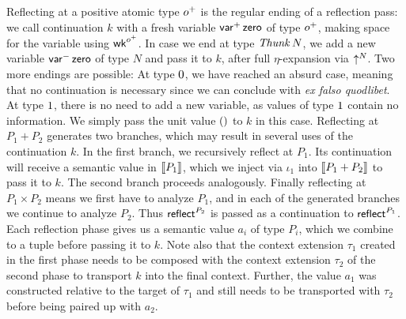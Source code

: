\documentclass[sigconf,screen,fleqn]{acmart} %
\begin{document}
Reflecting at a positive atomic type $o^+$ is the regular ending of a
reflection pass: we call continuation $k$ with a fresh variable
$\mathsf{var}^{+}\,\mathsf{zero}$ of type $o^+$, making space for the variable
using $\mathsf{wk}^{o^+}$.
In case we end at type $\mathit{Thunk}\,N$, we add a new variable
$\mathsf{var}^{-}\,\mathsf{zero}$ of type $N$ and pass it to $k$, after full
$\eta$-expansion via $\mathord{\uparrow_{}^{N}}$.  Two more endings are possible:
At type
$0$, we have reached an absurd case, meaning that no
continuation is necessary since we can conclude with
\emph{ex falso quodlibet}.
At type $1$, there is no need to add a new variable, as values
of type $1$ contain no information.  We simply pass the unit
value $()$ to $k$ in this case.
Reflecting at $P_1 + P_2$ generates two branches, which may result in
several uses of the continuation $k$.
In the first branch, we recursively reflect at $P_1$.  Its
continuation will receive a semantic value in $\mathopen{{[\kern-0.14em[}} P_1 \mathclose{{]\kern-0.14em]}}$, which we
inject via $\iota_1$ into $\mathopen{{[\kern-0.14em[}} P_1 + P_2 \mathclose{{]\kern-0.14em]}}$ to pass it to $k$.  The
second branch proceeds analogously.
Finally reflecting at $P_1 \times P_2$ means we first have to analyze
$P_1$, and in each of the generated branches we continue to analyze
$P_2$.  Thus $\mathsf{reflect}_{}^{P_2}$ is passed as a continuation to
$\mathsf{reflect}_{}^{P_1}$.  Each reflection phase gives us a semantic value
$a_i$ of type $P_i$, which we combine to a tuple before passing it to
$k$.  Note also that the context extension $\tau_1$ created in the
first phase needs to be composed with the context extension $\tau_2$
of the second phase to transport $k$ into the final context.  Further,
the value $a_1$ was constructed relative to the target of
$\tau_1$ and still needs
to be transported with $\tau_2$ before being paired up with $a_2$.
\end{document}
